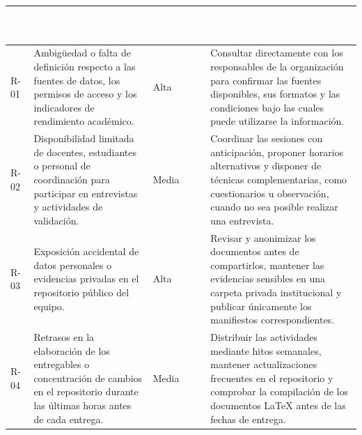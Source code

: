 \documentclass[11pt,a4paper]{article}
\begin{document}
\begin{tabularx}{\textwidth}{
    |>{\columncolor{azulclaro}\bfseries\raggedright\arraybackslash}p{1.4cm}
    |>{\raggedright\arraybackslash}X
    |>{\raggedright\arraybackslash}p{2.0cm}
    |>{\raggedright\arraybackslash}X|
}

\hline

\rowcolor{azul}
\textcolor{white}{\textbf{ID}} &
\textcolor{white}{\textbf{Descripción del riesgo}} &
\textcolor{white}{\textbf{Severidad}} &
\textcolor{white}{\textbf{Medida de respuesta}} \\

\hline

R-01 &
Ambigüedad o falta de definición respecto a las fuentes de datos, los permisos de acceso y los indicadores de rendimiento académico. &
Alta &
Consultar directamente con los responsables de la organización para confirmar las fuentes disponibles, sus formatos y las condiciones bajo las cuales puede utilizarse la información. \\

\hline

R-02 &
Disponibilidad limitada de docentes, estudiantes o personal de coordinación para participar en entrevistas y actividades de validación. &
Media &
Coordinar las sesiones con anticipación, proponer horarios alternativos y disponer de técnicas complementarias, como cuestionarios u observación, cuando no sea posible realizar una entrevista. \\

\hline

R-03 &
Exposición accidental de datos personales o evidencias privadas en el repositorio público del equipo. &
Alta &
Revisar y anonimizar los documentos antes de compartirlos, mantener las evidencias sensibles en una carpeta privada institucional y publicar únicamente los manifiestos correspondientes. \\

\hline

R-04 &
Retrasos en la elaboración de los entregables o concentración de cambios en el repositorio durante las últimas horas antes de cada entrega. &
Media &
Distribuir las actividades mediante hitos semanales, mantener actualizaciones frecuentes en el repositorio y comprobar la compilación de los documentos \LaTeX{} antes de las fechas de entrega. \\

\hline

\end{tabularx}
\end{document}
